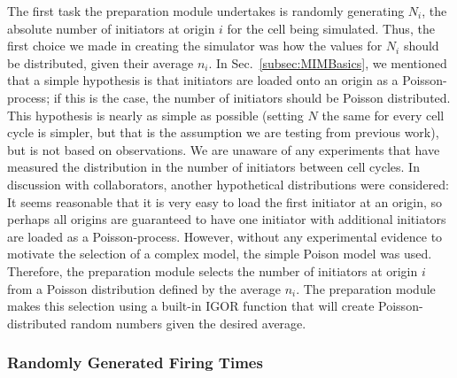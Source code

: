 			The first task the preparation module undertakes is randomly generating $N_i$, the absolute number of initiators at origin $i$ for the cell being simulated.
			Thus, the first choice we made in creating the simulator was how the values for $N_i$ should be distributed, given their average $n_i$.
			In Sec.~\ref{subsec:MIMBasics}, we mentioned that a simple hypothesis is that initiators are loaded onto an origin as a Poisson-process; if this is the case, the number of initiators should be Poisson distributed.
			This hypothesis is nearly as simple as possible (setting $N$ the same for every cell cycle is simpler, but that is the assumption we are testing from previous work), but is not based on observations.
			We are unaware of any experiments that have measured the distribution in the number of initiators between cell cycles.	
			In discussion with collaborators, another hypothetical distributions were considered:
			It seems reasonable that it is very easy to load the first initiator at an origin, so perhaps all origins are guaranteed to have one initiator with additional initiators are loaded as a Poisson-process.
			However, without any experimental evidence to motivate the selection of a complex model, the simple Poison model was used.
			Therefore, the preparation module selects the number of initiators at origin $i$ from a Poisson distribution defined by the average $n_i$.
			The preparation module makes this selection using a built-in IGOR function that will create Poisson-distributed random numbers given the desired average.
			
			
			\subsubsection{Randomly Generated Firing Times}
			
